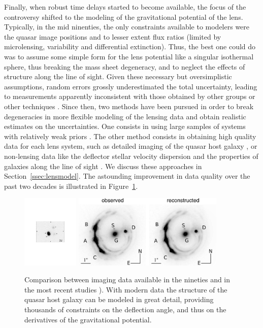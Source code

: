Finally, when robust time delays started to become available, the
focus of the controversy shifted to the modeling of the gravitational
potential of the lens. Typically, in the mid ninenties, the only
constraints available to modelers were the quasar image positions and
to lesser extent flux ratios (limited by microlensing, variability and
differential extinction). Thus, the best one could do was to assume
some simple form for the lens potential like a singular isothermal
sphere, thus breaking the mass sheet degeneracy, and to neglect the
effects of structure along the line of sight. Given these necessary
but oversimplistic assumptions, random errors grossly underestimated
the total uncertainty, leading to measurements apparently inconsistent
with those obtained by other groups or other techniques
\citep{K+S04}. Since then, two methods have been pursued in order to
break degeneracies in more flexible modeling of the lensing data and
obtain realistic estimates on the uncertainties. One consists in using
large samples of systems with relatively weak priors
\citep{Ogu07b}. The other method consists in obtaining high quality data for
each lens system, such as detailed imaging of the quasar host galaxy
\citep{Keeton:2000p241,WBB04,Suy++06}, or non-lensing data like the deflector
stellar velocity dispersion \citep{T+K02b} and the properties of
galaxies along the line of sight \citep{K+Z04,Suy++10}. We discuss
these approaches in Section~\ref{ssec:lensmodel}. The astounding
improvement in data quality over the past two decades is illustrated
in Figure~\ref{fig:oldvsmodernimage}.

\begin{figure}
\includegraphics[height=3.5cm]{figures/Schechter97_fg1.pdf}
\includegraphics[height=3.5cm]{figures/Suyu14_fig1.jpg}
\caption{Comparison between imaging data available in the nineties \citep[eft panel, from][]{Sch++97} and in the most recent studies \citep[middle and right panels, from][]{Suy++14}). With modern data the structure of the quasar host galaxy can be modeled in great detail, providing thousands of constraints on the deflection angle, and thus on the derivatives of the gravitational potential.}
\label{fig:oldvsmodernimage}
\end{figure}

